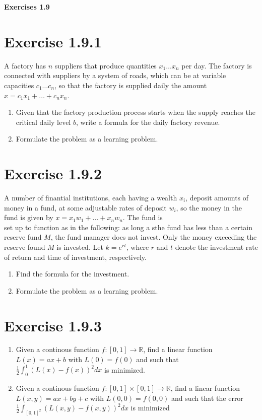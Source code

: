 \documentclass{exam}
\begin{document}
\begin{center}
    \textbf{\Large Exercises 1.9}    
\end{center}

\section*{Exercise 1.9.1}
A factory has $n$ suppliers that produce quantities $x_1 \dots x_n$ per day. The factory is connected with suppliers by a system of roads, which
can be at variable capacities $c_1 \dots c_n$, so that the factory is supplied
daily the amount $x = c_1 x_1 + \dots + c_n x_n$.
\begin{enumerate}
    \item Given that the factory production process starts when the supply reaches the critical daily level $b$, write a formula for the daily factory revenue.
    \item Formulate the problem as a learning problem.
\end{enumerate}   

\section*{Exercise 1.9.2}
A number of finantial institutions, each having a wealth $x_i$, deposit amounts of money in a fund, at some adjustable rates of 
deposit $w_i$, so the money in the fund is given by $x = x_1 w_1 + \dots + x_n w_n$. The fund is \\
set up to function as in the following: as long a sthe fund has less than a certain reserve fund $M$, the fund manager does not invest. Only the
money exceeding the reserve found $M$ is invested. Let $k = e ^ {r t}$, where $r$ and $t$ denote the investment rate of return and time of investment, respectively.
\begin{enumerate}
    \item Find the formula for the investment.
    \item Formulate the problem as a learning problem.
\end{enumerate}

\section*{Exercise 1.9.3}
\begin{enumerate}
    \item Given a continous function $f: [0,1] \rightarrow \mathbb{R}$, find a linear function $L(x) = ax + b$ with $L(0) = f(0)$ and such that 
    $\frac{1}{2} \int^{1}_{0}(L(x) - f(x))^2 dx$ is minimized.
    \item  Given a continous function $f: [0,1] \times [0,1] \rightarrow \mathbb{R}$, find a linear function $L(x,y) = ax + by + c$ with $L(0,0) = f(0,0)$ and 
    such that the error $\frac{1}{2} \int_{[0,1]^2}(L(x,y) - f(x,y))^2 dx$ is minimized
\end{enumerate}
\end{document}
